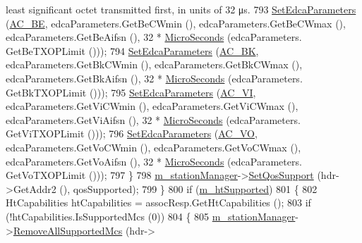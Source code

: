 \begin{DoxyCode}
{       least significant octet transmitted first, in units of 32 μs.}
793                       \hyperlink{classns3_1_1StaWifiMac_a9963539876f26c21aa9866bcf998cda7}{SetEdcaParameters} (\hyperlink{group__wifi_ggab422b4562ba272b39a9b6bca3513f3aca136016fc12611734060b599355503c29}{AC\_BE}, edcaParameters.GetBeCWmin (), 
      edcaParameters.GetBeCWmax (), edcaParameters.GetBeAifsn (), 32 * \hyperlink{group__timecivil_ga17465a639c8d1464e76538afdd78a9f0}{MicroSeconds} (edcaParameters.
      GetBeTXOPLimit ()));
794                       \hyperlink{classns3_1_1StaWifiMac_a9963539876f26c21aa9866bcf998cda7}{SetEdcaParameters} (\hyperlink{group__wifi_ggab422b4562ba272b39a9b6bca3513f3aca53e99420c645076e74307112d73eb38b}{AC\_BK}, edcaParameters.GetBkCWmin (), 
      edcaParameters.GetBkCWmax (), edcaParameters.GetBkAifsn (), 32 * \hyperlink{group__timecivil_ga17465a639c8d1464e76538afdd78a9f0}{MicroSeconds} (edcaParameters.
      GetBkTXOPLimit ()));
795                       \hyperlink{classns3_1_1StaWifiMac_a9963539876f26c21aa9866bcf998cda7}{SetEdcaParameters} (\hyperlink{group__wifi_ggab422b4562ba272b39a9b6bca3513f3aca1c60bd99c5ede59bb50b91182cb81d0f}{AC\_VI}, edcaParameters.GetViCWmin (), 
      edcaParameters.GetViCWmax (), edcaParameters.GetViAifsn (), 32 * \hyperlink{group__timecivil_ga17465a639c8d1464e76538afdd78a9f0}{MicroSeconds} (edcaParameters.
      GetViTXOPLimit ()));
796                       \hyperlink{classns3_1_1StaWifiMac_a9963539876f26c21aa9866bcf998cda7}{SetEdcaParameters} (\hyperlink{group__wifi_ggab422b4562ba272b39a9b6bca3513f3aca147b7f007ca5459e52ee93d1ebe83639}{AC\_VO}, edcaParameters.GetVoCWmin (), 
      edcaParameters.GetVoCWmax (), edcaParameters.GetVoAifsn (), 32 * \hyperlink{group__timecivil_ga17465a639c8d1464e76538afdd78a9f0}{MicroSeconds} (edcaParameters.
      GetVoTXOPLimit ()));
797                     \}
798                   \hyperlink{classns3_1_1RegularWifiMac_a76d1a5e27b64bfe36f24a55d1eea2775}{m\_stationManager}->\hyperlink{classns3_1_1WifiRemoteStationManager_a8146d57b94ed85447d28a3f66e24d45b}{SetQosSupport} (hdr->GetAddr2 (), 
      qosSupported);
799                 \}
800               \textcolor{keywordflow}{if} (\hyperlink{classns3_1_1RegularWifiMac_a8950c44b8cf2ad1f9274821cf88adc7b}{m\_htSupported})
801                 \{
802                   HtCapabilities htCapabilities = assocResp.GetHtCapabilities ();
803                   \textcolor{keywordflow}{if} (!htCapabilities.IsSupportedMcs (0))
804                     \{
805                       \hyperlink{classns3_1_1RegularWifiMac_a76d1a5e27b64bfe36f24a55d1eea2775}{m\_stationManager}->\hyperlink{classns3_1_1WifiRemoteStationManager_a56e6fa217c536de55870bbb7166501c7}{RemoveAllSupportedMcs} (hdr->

\end{DoxyCode}
